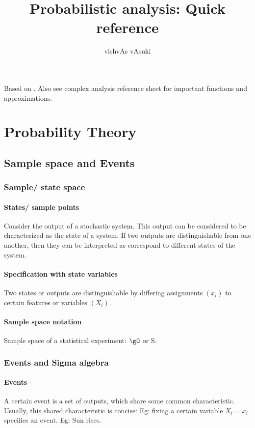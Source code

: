 \documentclass[oneside, article]{memoir}
\title{Probabilistic analysis: Quick reference}
\author{vishvAs vAsuki}
\begin{document}
\maketitle

Based on \cite{mitzenmacherUpfal}. Also see complex analysis reference sheet for important functions and approximations.

\tableofcontents

\part{Probability Theory}

\chapter{Sample space and Events}
\section{Sample/ state space}
\subsection{States/ sample points}
Consider the output of a stochastic system. This output can be considered to be characterized as the state of a system. If two outputs are distinguishable from one another, then they can be interpreted as correspond to different states of the system.

\subsection{Specification with state variables}
Two states or outputs are distinguishable by differing assignments $(x_i)$ to certain features or variables $(X_i)$.

\subsection{Sample space notation}
Sample space of a statistical experiment: $\gO$ or S.

\section{Events and Sigma algebra}
\subsection{Events}
A certain event is a set of outputs, which share some common characteristic. Usually, this shared characteristic is concise: Eg: fixing a certain variable $X_i= x_i$ specifies an event. Eg: Sun rises.
\end{document}
